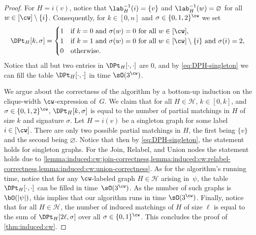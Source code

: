 \begin{proof}
    For $H = i(v)$, notice that $\lab^{-1}_H(i) = \{v\}$ and $\lab^{-1}_H(w) = \varnothing$ for all $w \in [\cw] \setminus \{i\}$.
    Consequently, for $k \in [0,n]$ and $\sigma \in \{0,1,2\}^{\cw}$ we set
    \begin{equation}\label{eq:DPH-singleton}
        \DPt_H[k,\sigma] =
            \begin{cases}
                1   &\text{if $k=0$ and $\sigma(w) = 0$ for all $w \in [\cw]$,}\\
                1   &\text{if $k=1$ and $\sigma(w) = 0$ for all $w \in [\cw] \setminus \{i\}$ and $\sigma(i) = 2$,}\\
                0   &\text{otherwise}.
            \end{cases}
    \end{equation}
    Notice that all but two entries in $\DPt_H[\cdot,\cdot]$ are $0$,
    and by \cref{eq:DPH-singleton} we can fill the table $\DPt_H[\cdot,\cdot]$ in time $\sO(3^{\cw})$.


    

    

    

    We argue about the correctness of the algorithm by a bottom-up induction on the clique-width $\cw$-expression of~$G$.
    We claim that for all $H \in \mathcal{H}$, $k \in [0,k]$, and $\sigma \in \{0,1,2\}^{\cw}$,
    $\DPt_H[k,\sigma]$ is equal to the number of partial matchings in $H$ of size $k$ and signature $\sigma$.
    Let $H = i(v)$ be a singleton graph for some label $i \in [\cw]$.
    There are only two possible partial matchings in $H$, the first being $\{v\}$ and the second being $\varnothing$.
    Notice that then by \cref{eq:DPH-singleton}, the statement holds for singleton graphs.
    For the Join, Relabel, and Union nodes the statement holds due to
    \cref{lemma:induced:cw:join-correctness,lemma:induced:cw:relabel-correctness,lemma:induced:cw:union-correctness}.
    As for the algorithm's running time, notice that for any $\cw$-labeled graph $H \in \mathcal{H}$ arising in~$\psi$,
    the table $\DPt_H[\cdot,\cdot]$ can be filled in time~$\sO(3^{\cw})$.
    As the number of such graphs is~$\bO(|\psi|)$, this implies that our algorithm runs in time $\sO(3^{\cw})$.
    Finally, notice that for all $H \in \mathcal{H}$,
    the number of induced matchings of $H$ of size $\ell$ is equal to the sum of $\DPt_H[2\ell,\sigma]$
    over all $\sigma \in \{0,1\}^{\cw}$.
    This concludes the proof of \cref{thm:induced:cw}.
\end{proof}
